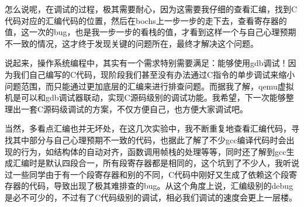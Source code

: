 \documentclass[forprint]{WHUBachelor}
\begin{document}
怎么说呢，在调试的过程，极其需要耐心，因为这需要我仔细的查看汇编，找到C代码对应的汇编代码的位置，然后在bochs上一步一步的走下去，查看寄存器的值，这一次的bug，也是我一步一步的看栈的值，才看到这样一个与自己心理预期不一致的情况，这才终于发现关键的问题所在，最终才解决这个问题。

说起来，操作系统编程中，其实有一个需求特别需要满足：能够使用gdb调试！因为我们自己编写的C代码，现阶段我们甚至没有办法通过C指令的单步调试来缩小问题范围，而只能通过更加底层的汇编来进行排查问题。而据我了解，qemu虚拟机是可以和gdb调试器联动，实现C源码级别的调试功能。我希望，下一次能够整理出一套C源码级调试的方案，不仅方便自己，也方便大家调试吧。

当然，多看点汇编也并无坏处，在这几次实验中，我不断重复地查看汇编代码，寻找其中部分与自己心理预期不一致的代码，也据此了解了不少gcc编译代码时会出现的行为，如结构体的自动对齐，函数调用帧栈的处理等等，同时还了解到gcc生成汇编时是默认四段合一，所有段寄存器都是相同的，这个坑到了不少人，我听说过一些同学由于有一个段寄存器和别的不同，C代码中刚好又生成了依赖这个段寄存器的代码，导致出现了极其难排查的bug。从这个角度上说，汇编级别的debug是必不可少的，不过有了C代码级别的调试，相必我们调试的速度会更上一层楼。







% 
% 





\appendix
\end{document}
